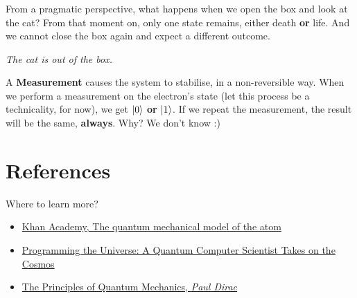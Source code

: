 \documentclass[aspectratio=43]{beamer}
\begin{document}
\subsubsection{\qmt}
\begin{frame}{\qmt}
    \begin{cardTiny}
        From a pragmatic perspective, what happens when we open the box and look at the cat? From that moment on, only one state remains, either death \textbf{or} life. And we cannot close the box again and expect a different outcome.
    \end{cardTiny}
    \begin{cardTiny}
        \centering\textit{The cat is out of the box.}
    \end{cardTiny}
    \begin{cardTiny}
        A \textbf{Measurement} causes the system to stabilise, in a non-reversible way. When we perform a measurement  on the electron's state (let this process be a technicality, for now), we get $\ket{0}$ \textbf{or} $\ket{1}$. If we repeat the measurement, the result will be the same, \textbf{always}. Why? We don't know :)
    \end{cardTiny}
\pagenumber
\end{frame}

\section{References}
\begin{frame}{Where to learn more?}
\begin{card}
    \begin{itemize}
        \item \href{https://www.khanacademy.org/science/physics/quantum-physics/quantum-numbers-and-orbitals/a/the-quantum-mechanical-model-of-the-atom}{Khan Academy, The quantum mechanical model of the atom}
        \item \href{https://www.goodreads.com/book/show/331680.Programming_the_Universe}{Programming the Universe: A Quantum Computer Scientist Takes on the Cosmos}
        \item \href{https://www.goodreads.com/book/show/260142.The_Principles_of_Quantum_Mechanics}{The Principles of Quantum Mechanics, \textit{Paul Dirac}}
    \end{itemize}
\end{card}
\end{frame}
\end{document}
